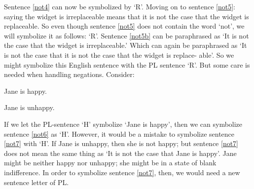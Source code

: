 Sentence \ref{not4} can now be symbolized by ‘R’. Moving on to sentence \ref{not5}: saying the widget is irreplaceable means that it is not the case that the widget is replaceable. So even though sentence \ref{not5} does not contain the word ‘not’, we will symbolize it as follows: ‘\enot R’.
Sentence \ref{not5b} can be paraphrased as ‘It is not the case that the widget is irreplaceable.’ Which can again be paraphrased as ‘It is not the case that it is not the case that the widget is replace- able’. So we might symbolize this English sentence with the PL sentence ‘\enot \enot R’.
But some care is needed when handling negations. Consider:
	\begin{earg}
		\item[\ex{not6}] Jane is happy.
		\item[\ex{not7}] Jane is unhappy.
	\end{earg}
If we let the PL-sentence ‘H’ symbolize ‘Jane is happy’, then we can symbolize sentence \ref{not6} as ‘H’. However, it would be a mistake to symbolize sentence \ref{not7} with ‘\enot H’. If Jane is unhappy, then she is not happy; but sentence  \ref{not7} does not mean the same thing as ‘It is not the case that Jane is happy’. Jane might be neither happy nor unhappy; she might be in a state of blank indifference. In order to symbolize sentence  \ref{not7}, then, we would need a new sentence letter of PL.
